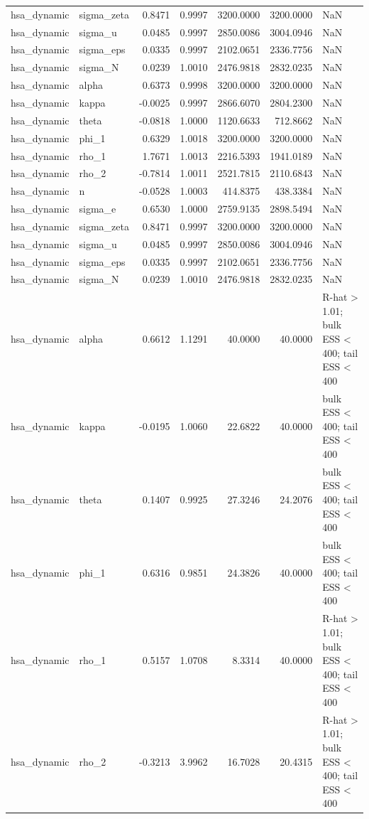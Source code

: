 \begin{tabular}{llrrrrl}
hsa\_dynamic & sigma\_zeta & 0.8471 & 0.9997 & 3200.0000 & 3200.0000 & NaN \\
hsa\_dynamic & sigma\_u & 0.0485 & 0.9997 & 2850.0086 & 3004.0946 & NaN \\
hsa\_dynamic & sigma\_eps & 0.0335 & 0.9997 & 2102.0651 & 2336.7756 & NaN \\
hsa\_dynamic & sigma\_N & 0.0239 & 1.0010 & 2476.9818 & 2832.0235 & NaN \\
hsa\_dynamic & alpha & 0.6373 & 0.9998 & 3200.0000 & 3200.0000 & NaN \\
hsa\_dynamic & kappa & -0.0025 & 0.9997 & 2866.6070 & 2804.2300 & NaN \\
hsa\_dynamic & theta & -0.0818 & 1.0000 & 1120.6633 & 712.8662 & NaN \\
hsa\_dynamic & phi\_1 & 0.6329 & 1.0018 & 3200.0000 & 3200.0000 & NaN \\
hsa\_dynamic & rho\_1 & 1.7671 & 1.0013 & 2216.5393 & 1941.0189 & NaN \\
hsa\_dynamic & rho\_2 & -0.7814 & 1.0011 & 2521.7815 & 2110.6843 & NaN \\
hsa\_dynamic & n & -0.0528 & 1.0003 & 414.8375 & 438.3384 & NaN \\
hsa\_dynamic & sigma\_e & 0.6530 & 1.0000 & 2759.9135 & 2898.5494 & NaN \\
hsa\_dynamic & sigma\_zeta & 0.8471 & 0.9997 & 3200.0000 & 3200.0000 & NaN \\
hsa\_dynamic & sigma\_u & 0.0485 & 0.9997 & 2850.0086 & 3004.0946 & NaN \\
hsa\_dynamic & sigma\_eps & 0.0335 & 0.9997 & 2102.0651 & 2336.7756 & NaN \\
hsa\_dynamic & sigma\_N & 0.0239 & 1.0010 & 2476.9818 & 2832.0235 & NaN \\
hsa\_dynamic & alpha & 0.6612 & 1.1291 & 40.0000 & 40.0000 & R-hat > 1.01; bulk ESS < 400; tail ESS < 400 \\
hsa\_dynamic & kappa & -0.0195 & 1.0060 & 22.6822 & 40.0000 & bulk ESS < 400; tail ESS < 400 \\
hsa\_dynamic & theta & 0.1407 & 0.9925 & 27.3246 & 24.2076 & bulk ESS < 400; tail ESS < 400 \\
hsa\_dynamic & phi\_1 & 0.6316 & 0.9851 & 24.3826 & 40.0000 & bulk ESS < 400; tail ESS < 400 \\
hsa\_dynamic & rho\_1 & 0.5157 & 1.0708 & 8.3314 & 40.0000 & R-hat > 1.01; bulk ESS < 400; tail ESS < 400 \\
hsa\_dynamic & rho\_2 & -0.3213 & 3.9962 & 16.7028 & 20.4315 & R-hat > 1.01; bulk ESS < 400; tail ESS < 400 \\

\end{tabular}
